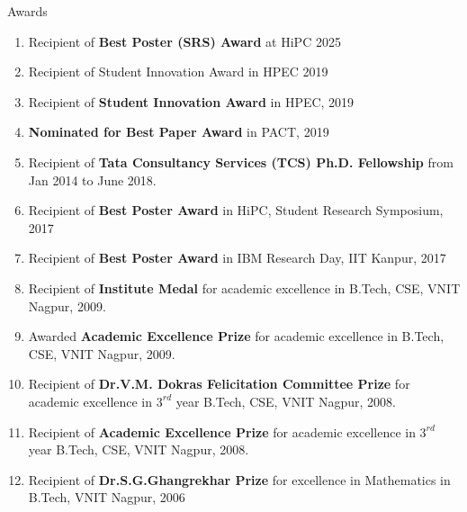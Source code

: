 \documentclass{resume} %
\begin{document}
\begin{rSection}{Awards}
	\begin{enumerate}
		\item Recipient of \textbf{Best Poster (SRS) Award} at HiPC 2025
		\item Recipient of Student Innovation Award in HPEC 2019
		\item Recipient of \textbf{Student Innovation Award} in HPEC, 2019
		\item \textbf{Nominated for Best Paper Award} in PACT, 2019
		\item Recipient of \textbf{Tata Consultancy Services (TCS) Ph.D. Fellowship} from Jan 2014 to June 2018.
		\item Recipient of \textbf{Best Poster Award} in HiPC, Student Research Symposium, 2017
		\item Recipient of \textbf{Best Poster Award} in IBM Research Day, IIT Kanpur, 2017
		\item Recipient of \textbf{Institute Medal} for academic excellence in B.Tech, CSE, VNIT Nagpur, 2009.
		\item Awarded \textbf{Academic Excellence Prize} for academic excellence in B.Tech, CSE, VNIT Nagpur, 2009.
		\item Recipient of \textbf{Dr.V.M. Dokras Felicitation Committee Prize} for academic excellence in $3^{rd}$ year B.Tech, CSE, VNIT Nagpur, 2008.
		\item Recipient of \textbf{Academic Excellence Prize} for academic excellence in $3^{rd}$ year B.Tech, CSE, VNIT Nagpur, 2008.
		\item Recipient of \textbf{Dr.S.G.Ghangrekhar Prize} for excellence in Mathematics in B.Tech, VNIT Nagpur, 2006
	\end{enumerate}
\end{rSection}
\end{document}

